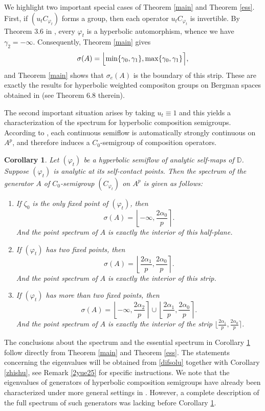 \documentclass{amsart}
\theoremstyle{proclaim}
\newtheorem{corollary}[theorem]{Corollary}
\theoremstyle{fancyproclaim}
\theoremstyle{definition}
\theoremstyle{fancystatement}
\numberwithin{equation}{section}
\begin{document}
We highlight two important special cases of Theorem \ref{main} and Theorem \ref{ess}. First, if $(u_tC_{\varphi_t})$ forms a group, then each operator $u_tC_{\varphi_t}$ is invertible. By Theorem 3.6 in \cite{sp2},  every $\varphi_t$ is a hyperbolic automorphism, whence we have $\gamma_2=-\infty$. Consequently, Theorem \ref{main} gives
$$\sigma(A)=\Bigl\lfloor \min\{\gamma_0,\gamma_1\}, \max\{\gamma_0,\gamma_1\}\Bigr\rceil,$$
and Theorem \ref{main} shows that $\sigma_e(A)$ is the boundary of this strip. These are exactly the results for hyperbolic weighted compositon groups on Bergman spaces obtained in \cite{aim} (see Theorem 6.8 therein).


The second important situation arises by taking $u_t\equiv 1$ and this yields a characterization of the spectrum for hyperbolic composition semigroups. According to \cite{strongly}, each continuous semiflow is automatically strongly continuous on $A^p$, and therefore induces a $C_0$-semigroup of composition operators.


\begin{corollary}\label{compositions}
Let $(\varphi_t)$ be a hyperbolic semiflow of analytic self-maps of $\mathbb{D}$. Suppose $(\varphi_t)$ is analytic at its self-contact points. Then the spectrum of the generator $A$ of $C_0$-semigroup $(C_{\varphi_t})$ on $A^p$ is given as follows:
\begin{enumerate}
\item If  $\zeta_0$ is the only fixed point of $(\varphi_t)$, then 
$$\sigma(A)=\left\lfloor -\infty, \frac{2\alpha_0}{p}\right\rceil.$$
And the point spectrum of $A$ is exactly the interior of this half-plane.

\item If $(\varphi_t)$ has two fixed points, then 
$$\sigma(A)=\left\lfloor \frac{2\alpha_1}{p}, \frac{2\alpha_0}{p}\right\rceil.$$
And the point spectrum of $A$ is exactly the interior of this strip.

\item If $(\varphi_t)$ has more than two fixed points, then 
$$\sigma(A)=\left\lfloor -\infty, \frac{2\alpha_2}{p}\right\rceil\cup\left\lfloor \frac{2\alpha_1}{p}, \frac{2\alpha_0}{p}\right\rceil.$$
And the point spectrum of $A$ is exactly the interior of the strip $\lfloor \frac{2\alpha_1}{p}, \frac{2\alpha_0}{p}\rceil$.
\end{enumerate}

\end{corollary}

The conclusions about the spectrum and the essential spectrum in Corollary \ref{compositions} follow directly from Theorem \ref{main} and Theorem \ref{ess}. The statements concerning the eigenvalues will be obtained from  \eqref{difsolu} together with Corollary \ref{zhishu}, see Remark \ref{2yue25} for specific instructions. We note that the eigenvalues of generators of hyperbolic composition semigroups have already been characterized under more general settings in \cite{tezheng1,tezheng2}. However,  a complete description of the full spectrum of such generators was lacking before Corollary \ref{compositions}.
\end{document}
